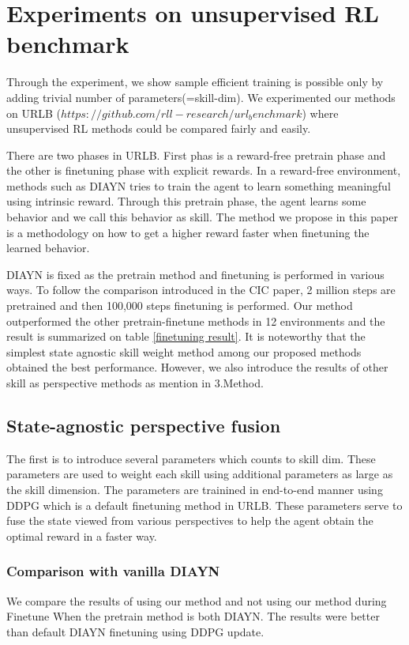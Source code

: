 \section{Experiments on unsupervised RL benchmark}

Through the experiment, we show sample efficient training is possible only by adding trivial number of parameters(=skill-dim).
We experimented our methods on URLB ($https://github.com/rll-research/url_benchmark$) where unsupervised RL methods could be compared fairly and easily.

There are two phases in URLB.
First phas is a reward-free pretrain phase and the other is finetuning phase with explicit rewards.
In a reward-free environment, methods such as DIAYN tries to train the agent to learn something meaningful using intrinsic reward.
Through this pretrain phase, the agent learns some behavior and we call this behavior as skill.
The method we propose in this paper is a methodology on how to get a higher reward faster when finetuning the learned behavior.

DIAYN is fixed as the pretrain method and finetuning is performed in various ways.
To follow the comparison introduced in the CIC paper, 2 million steps are pretrained and then 100,000 steps finetuning is performed.
Our method outperformed the other pretrain-finetune methods in 12 environments and the result is summarized on table \cref{finetuning result}.
It is noteworthy that the simplest state agnostic skill weight method among our proposed methods obtained the best performance. 
However, we also introduce the results of other skill as perspective methods as mention in 3.Method.

\subsection{State-agnostic perspective fusion}
The first is to introduce several parameters which counts to skill dim.
These parameters are used to weight each skill using additional parameters as large as the skill dimension.
The parameters are trainined in end-to-end manner using DDPG which is a default finetuning method in URLB.
These parameters serve to fuse the state viewed from various perspectives to help the agent obtain the optimal reward in a faster way.



\subsubsection{Comparison with vanilla DIAYN}
We compare the results of using our method and not using our method during Finetune When the pretrain method is both DIAYN.
The results were better than default DIAYN finetuning using DDPG update.


